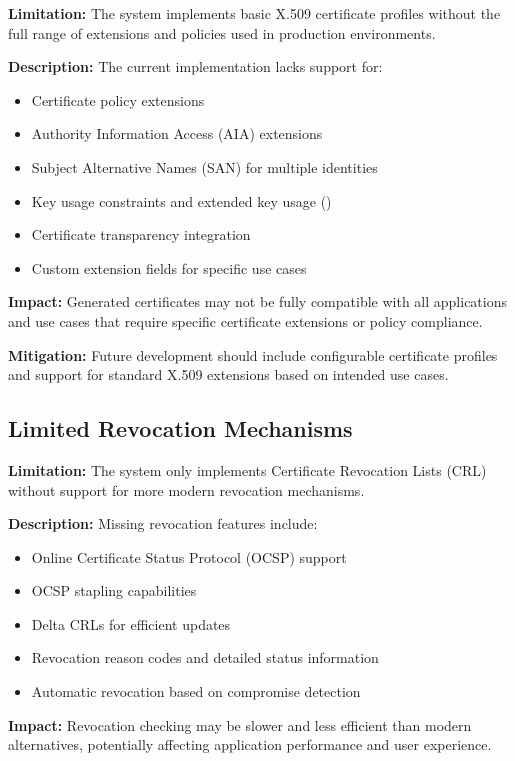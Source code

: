 \textbf{Limitation:} The system implements basic X.509 certificate profiles without the full range of extensions and policies used in production environments.

\textbf{Description:} The current implementation lacks support for:
\begin{itemize}
    \item Certificate policy extensions
    \item Authority Information Access (AIA) extensions
    \item Subject Alternative Names (SAN) for multiple identities
    \item Key usage constraints and extended key usage ({\color{red}{TODO: Check}})
    \item Certificate transparency integration
    \item Custom extension fields for specific use cases
\end{itemize}

\textbf{Impact:} Generated certificates may not be fully compatible with all applications and use cases that require specific certificate extensions or policy compliance.

\textbf{Mitigation:} Future development should include configurable certificate profiles and support for standard X.509 extensions based on intended use cases.

\subsection{Limited Revocation Mechanisms}

\textbf{Limitation:} The system only implements Certificate Revocation Lists (CRL) without support for more modern revocation mechanisms.

\textbf{Description:} Missing revocation features include:
\begin{itemize}
    \item Online Certificate Status Protocol (OCSP) support
    \item OCSP stapling capabilities
    \item Delta CRLs for efficient updates
    \item Revocation reason codes and detailed status information
    \item Automatic revocation based on compromise detection
\end{itemize}

\textbf{Impact:} Revocation checking may be slower and less efficient than modern alternatives, potentially affecting application performance and user experience.


